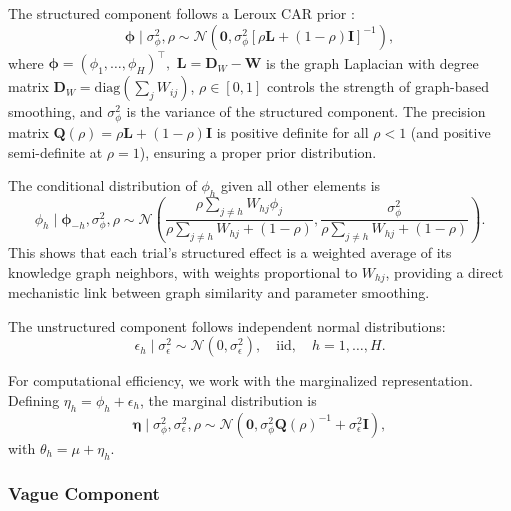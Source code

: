 \documentclass[12pt]{article}
\newcommand{\bphi}{\boldsymbol{\phi}}
\newcommand{\bW}{\mathbf{W}}
\newcommand{\bL}{\mathbf{L}}
\newcommand{\bD}{\mathbf{D}}
\newcommand{\bI}{\mathbf{I}}
\newcommand{\bQ}{\mathbf{Q}}
\begin{document}
The structured component follows a Leroux CAR prior \citep{leroux2000estimation}:
\begin{equation}
\label{eq:leroux}
\bphi \mid \sigma_\phi^2, \rho \sim \mathcal{N}\left(\mathbf{0}, \sigma_\phi^2 \left[\rho \bL + (1 - \rho) \bI\right]^{-1}\right),
\end{equation}
where $\bphi = (\phi_1, \ldots, \phi_H)^\top,$ $\bL = \bD_W - \bW$ is the graph Laplacian with degree matrix $\bD_W = \text{diag}(\sum_j W_{ij})$, $\rho \in [0, 1]$ controls the strength of graph-based smoothing, and $\sigma_\phi^2$ is the variance of the structured component. The precision matrix $\bQ(\rho) = \rho \bL + (1 - \rho) \bI$ is positive definite for all $\rho < 1$ (and positive semi-definite at $\rho = 1$), ensuring a proper prior distribution.

The conditional distribution of $\phi_h$ given all other elements is
\begin{equation}
\label{eq:car_conditional}
\phi_h \mid \bphi_{-h}, \sigma_\phi^2, \rho \sim \mathcal{N}\left(\frac{\rho \sum_{j \neq h} W_{hj} \phi_j}{\rho \sum_{j \neq h} W_{hj} + (1 - \rho)}, \frac{\sigma_\phi^2}{\rho \sum_{j \neq h} W_{hj} + (1 - \rho)}\right).
\end{equation}
This shows that each trial's structured effect is a weighted average of its knowledge graph neighbors, with weights proportional to $W_{hj}$, providing a direct mechanistic link between graph similarity and parameter smoothing.

The unstructured component follows independent normal distributions:
\begin{equation}
\label{eq:unstructured}
\epsilon_h \mid \sigma_\epsilon^2 \sim \mathcal{N}(0, \sigma_\epsilon^2), \quad \text{iid}, \quad h = 1, \ldots, H.
\end{equation}

For computational efficiency, we work with the marginalized representation. Defining $\eta_h = \phi_h + \epsilon_h$, the marginal distribution is
\begin{equation}
\label{eq:marginal}
\boldsymbol{\eta} \mid \sigma_\phi^2, \sigma_\epsilon^2, \rho \sim \mathcal{N}\left(\mathbf{0}, \sigma_\phi^2 \bQ(\rho)^{-1} + \sigma_\epsilon^2 \bI\right),
\end{equation}
with $\theta_h = \mu + \eta_h$.

\subsubsection{Vague Component}
\end{document}
